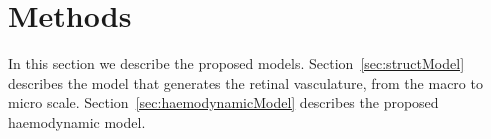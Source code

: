\documentclass[11pt,]{article}
\begin{document}

\section{Methods}\label{sec:methods}

In this section we describe the proposed models.
Section~\ref{sec:structModel} describes the model that generates the
retinal vasculature, from the macro to micro scale.
Section~\ref{sec:haemodynamicModel} describes the proposed haemodynamic
model.
\end{document}
